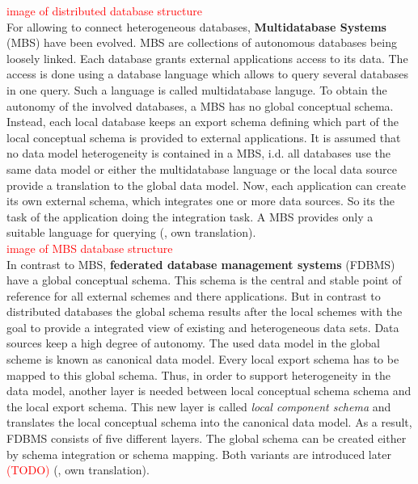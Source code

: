 \textcolor{red}{image of distributed database structure}\\

For allowing to connect heterogeneous databases, \textbf{Multidatabase Systems} (MBS) have been evolved. MBS are collections of autonomous databases being loosely linked. Each database grants external applications access to its data. The access is done using a database language which allows to query several databases in one query. Such a language is called multidatabase languge. To obtain the autonomy  of the involved databases, a MBS has no global conceptual schema. Instead, each local database keeps an export schema defining which part of the local conceptual schema is provided to external applications.  
It is assumed that no data model heterogeneity is contained in a MBS, i.d. all databases use the same data model or either the multidatabase language or the local data source provide a translation to the global data model. Now, each application can create its own external schema, which integrates one or more data sources. So its the task of the application doing the integration task. A MBS provides only a suitable language for querying (\cite[p. 93/94]{DBLP:books/dp/LeserN2006}, own translation).\\

\textcolor{red}{image of MBS database structure}\\

In contrast to MBS, \textbf{federated database management systems} (FDBMS) have a global conceptual schema. This schema is the central and stable point of reference for all external schemes and there applications. But in contrast to distributed databases the global schema results after the local schemes with the goal to provide a integrated view of existing and heterogeneous data sets. Data sources keep a high degree of autonomy.
The used data model in the global scheme is known as canonical data model. Every local export schema has to be mapped to this global schema. Thus, in order to support heterogeneity in the data model, another layer is needed between local conceptual schema schema and the local export schema. This new layer is called \textit{local component schema} and translates the local conceptual schema into the canonical data model. As a result, FDBMS consists of five different layers.
The global schema can be created either by schema integration or schema mapping. Both variants are introduced later \textcolor{red}{(TODO)}
(\cite[p. 94/95]{DBLP:books/dp/LeserN2006}, own translation).\\

